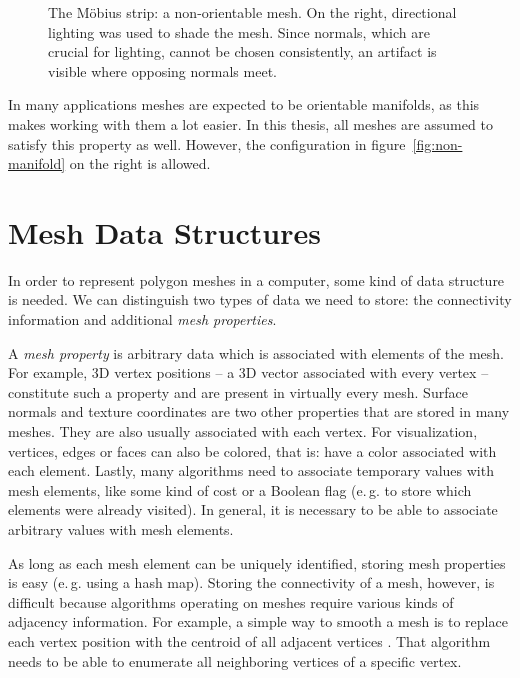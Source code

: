 \begin{figure}[t]
  \centering
  
  \caption{The Möbius strip: a non-orientable mesh.
    On the right, directional lighting was used to shade the mesh.
    Since normals, which are crucial for lighting, cannot be chosen consistently, an artifact is visible where opposing normals meet.}
  \label{fig:moebius}
\end{figure}


In many applications meshes are expected to be orientable manifolds, as this makes working with them a lot easier.
In this thesis, all meshes are assumed to satisfy this property as well.
However, the configuration in figure~\ref{fig:non-manifold} on the right is allowed.


\section{Mesh Data Structures}

In order to represent polygon meshes in a computer, some kind of data structure is needed.
We can distinguish two types of data we need to store: the connectivity information and additional \emph{mesh properties}.

A \emph{mesh property} is arbitrary data which is associated with elements of the mesh.
For example, 3D vertex positions -- a 3D vector associated with every vertex -- constitute such a property and are present in virtually every mesh.
Surface normals and texture coordinates are two other properties that are stored in many meshes.
They are also usually associated with each vertex.
For visualization, vertices, edges or faces can also be colored, that is: have a color associated with each element.
Lastly, many algorithms need to associate temporary values with mesh elements, like some kind of cost or a Boolean flag (e.\,g. to store which elements were already visited).
In general, it is necessary to be able to associate arbitrary values with mesh elements.

As long as each mesh element can be uniquely identified, storing mesh properties is easy (e.\,g. using a hash map).
Storing the connectivity of a mesh, however, is difficult because algorithms operating on meshes require various kinds of adjacency information.
For example, a simple way to smooth a mesh is to replace each vertex position with the centroid of all adjacent vertices \cite[Chapter~3]{botsch2010polygon}.
That algorithm needs to be able to enumerate all neighboring vertices of a specific vertex.

